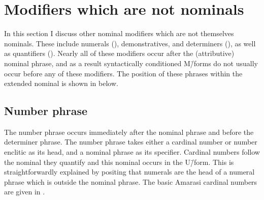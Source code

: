 \section{Modifiers which are not nominals}\label{sec:OthNomMod}
In this section I discuss other nominal modifiers
which are not themselves nominals.
These include numerals (),
demonstratives, and determiners (),
as well as quantifiers ().
Nearly all of these modifiers occur after the (attributive) nominal phrase,
and as a result syntactically conditioned M\=/forms do not usually occur before any of these modifiers.
The position of these phrases within the extended nominal is shown in  below.

\begin{exe}
	\label{tr:ExtNom3}
\end{exe}



\subsection{Number phrase}\label{sec:NumPhr}
The number phrase occurs immediately after the nominal phrase
and before the determiner phrase.
The number phrase takes either a cardinal number or number enclitic
as its head, and a nominal phrase as its specifier.
Cardinal numbers follow the nominal they quantify and this nominal occurs in the U\=/form.
This is straightforwardly explained by positing that numerals
are the head of a numeral phrase which is outside the nominal phrase.
The basic Amarasi cardinal numbers are given in .

